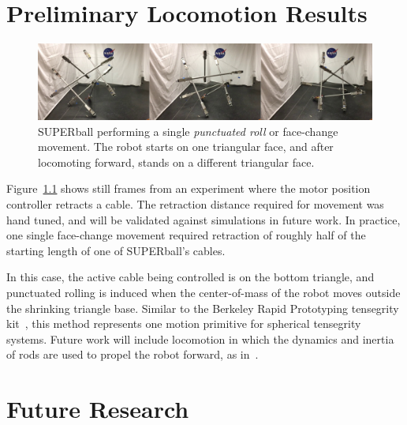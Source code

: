 \documentclass[12pt]{report}
\begin{document}



\chapter{Preliminary Locomotion Results}

\begin{figure}[thbp]
    \centering
    \includegraphics[width=1\linewidth]{img/superball_flop_combined.jpg}
    \caption{SUPERball performing a single \emph{punctuated roll} or face-change movement. The robot starts on one triangular face, and after locomoting forward, stands on a different triangular face.}
    \label{fig:superball_flop_flat}
\end{figure}

Figure~\ref{fig:superball_flop_flat} shows still frames from an experiment where the motor position controller retracts a cable.
The retraction distance required for movement was hand tuned, and will be validated against simulations in future work.
In practice, one single face-change movement required retraction of roughly half of the starting length of one of SUPERball's cables.

In this case, the active cable being controlled is on the bottom triangle, and punctuated rolling is induced when the center-of-mass of the robot moves outside the shrinking triangle base.
Similar to the Berkeley Rapid Prototyping tensegrity kit~\cite{kim2014rapid}, this method represents one motion primitive for spherical tensegrity systems.
Future work will include locomotion in which the dynamics and inertia of rods are used to propel the robot forward, as in~\cite{Iscen2013,Iscen2013b}.

\chapter{Future Research}
\end{document}
